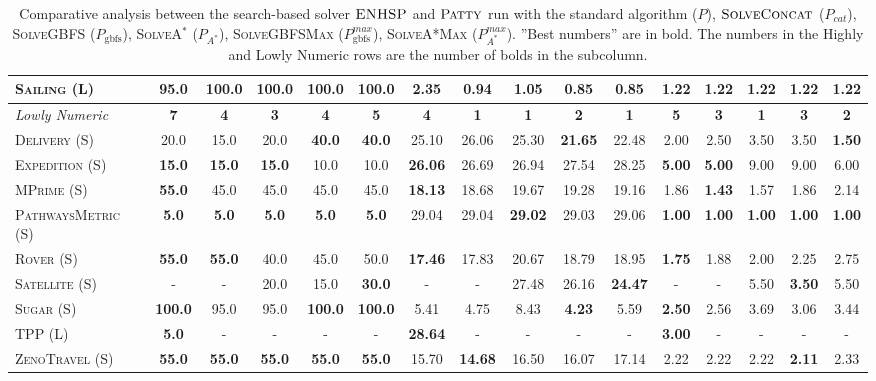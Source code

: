 \documentclass[11pt,landscape]{article}
\begin{document}
\begin{table*}[tb]
{\begin{tabular}{|l||ccccc||ccccc||ccccc||}
\textsc{Sailing} (L)&95.0&\textbf{100.0}&\textbf{100.0}&\textbf{100.0}&\textbf{100.0}&2.35&0.94&1.05&\textbf{0.85}&\textbf{0.85}&\textbf{1.22}&\textbf{1.22}&\textbf{1.22}&\textbf{1.22}&\textbf{1.22}
\\\hline
\textit{Lowly Numeric}&\textbf{7}&\textbf{4}&\textbf{3}&\textbf{4}&\textbf{5}&\textbf{4}&\textbf{1}&\textbf{1}&\textbf{2}&\textbf{1}&\textbf{5}&\textbf{3}&\textbf{1}&\textbf{3}&\textbf{2}\\\hline
\textsc{Delivery} (S)&20.0&15.0&20.0&\textbf{40.0}&\textbf{40.0}&25.10&26.06&25.30&\textbf{21.65}&22.48&2.00&2.50&3.50&3.50&\textbf{1.50}\\
\textsc{Expedition} (S)&\textbf{15.0}&\textbf{15.0}&\textbf{15.0}&10.0&10.0&\textbf{26.06}&26.69&26.94&27.54&28.25&\textbf{5.00}&\textbf{5.00}&9.00&9.00&6.00\\
\textsc{MPrime} (S)&\textbf{55.0}&45.0&45.0&45.0&45.0&\textbf{18.13}&18.68&19.67&19.28&19.16&1.86&\textbf{1.43}&1.57&1.86&2.14\\
\textsc{PathwaysMetric} (S)&\textbf{5.0}&\textbf{5.0}&\textbf{5.0}&\textbf{5.0}&\textbf{5.0}&29.04&29.04&\textbf{29.02}&29.03&29.06&\textbf{1.00}&\textbf{1.00}&\textbf{1.00}&\textbf{1.00}&\textbf{1.00}\\
\textsc{Rover} (S)&\textbf{55.0}&\textbf{55.0}&40.0&45.0&50.0&\textbf{17.46}&17.83&20.67&18.79&18.95&\textbf{1.75}&1.88&2.00&2.25&2.75\\
\textsc{Satellite} (S)&-&-&20.0&15.0&\textbf{30.0}&-&-&27.48&26.16&\textbf{24.47}&-&-&5.50&\textbf{3.50}&5.50\\
\textsc{Sugar} (S)&\textbf{100.0}&95.0&95.0&\textbf{100.0}&\textbf{100.0}&5.41&4.75&8.43&\textbf{4.23}&5.59&\textbf{2.50}&2.56&3.69&3.06&3.44\\
\textsc{TPP} (L)&\textbf{5.0}&-&-&-&-&\textbf{28.64}&-&-&-&-&\textbf{3.00}&-&-&-&-\\
\textsc{ZenoTravel} (S)&\textbf{55.0}&\textbf{55.0}&\textbf{55.0}&\textbf{55.0}&\textbf{55.0}&15.70&\textbf{14.68}&16.50&16.07&17.14&2.22&2.22&2.22&\textbf{2.11}&2.33
\\\hline

        \end{tabular}}
        \caption{Comparative analysis between the search-based solver $\textsc{ENHSP}$ and  $\textsc{Patty}$ run with the standard algorithm ($P$),  $\textsc{SolveConcat}$ ($P_{cat}$), \textsc{SolveGBFS} ($P_\text{gbfs}$), \textsc{SolveA}$^*$ ($P_{A^*}$), \textsc{SolveGBFSMax} ($P_\text{gbfs}^{max}$), \textsc{SolveA*Max} ($P_{A^*}^{max}$). ''Best numbers'' are in bold.  The numbers in the Highly and Lowly Numeric rows are the number of bolds in the subcolumn.}
        \label{tab:experiments}
        \end{table*}
        
\end{document}
